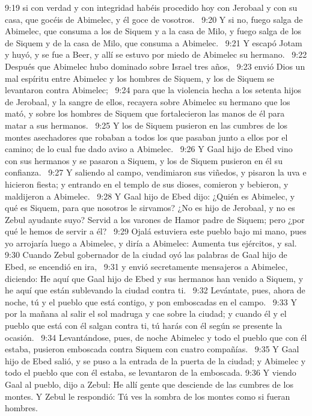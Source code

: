 9:19 si con verdad y con integridad habéis procedido hoy con Jerobaal y con su casa, que gocéis de Abimelec, y él goce de vosotros.  
9:20 Y si no, fuego salga de Abimelec, que consuma a los de Siquem y a la casa de Milo, y fuego salga de los de Siquem y de la casa de Milo, que consuma a Abimelec.  
9:21 Y escapó Jotam y huyó, y se fue a Beer, y allí se estuvo por miedo de Abimelec su hermano.  
9:22 Después que Abimelec hubo dominado sobre Israel tres años,  
9:23 envió Dios un mal espíritu entre Abimelec y los hombres de Siquem, y los de Siquem se levantaron contra Abimelec;  
9:24 para que la violencia hecha a los setenta hijos de Jerobaal, y la sangre de ellos, recayera sobre Abimelec su hermano que los mató, y sobre los hombres de Siquem que fortalecieron las manos de él para matar a sus hermanos.  
9:25 Y los de Siquem pusieron en las cumbres de los montes asechadores que robaban a todos los que pasaban junto a ellos por el camino; de lo cual fue dado aviso a Abimelec.  
9:26 Y Gaal hijo de Ebed vino con sus hermanos y se pasaron a Siquem, y los de Siquem pusieron en él su confianza.  
9:27 Y saliendo al campo, vendimiaron sus viñedos, y pisaron la uva e hicieron fiesta; y entrando en el templo de sus dioses, comieron y bebieron, y maldijeron a Abimelec.  
9:28 Y Gaal hijo de Ebed dijo: ¿Quién es Abimelec, y qué es Siquem, para que nosotros le sirvamos? ¿No es hijo de Jerobaal, y no es Zebul ayudante suyo? Servid a los varones de Hamor padre de Siquem; pero ¿por qué le hemos de servir a él?  
9:29 Ojalá estuviera este pueblo bajo mi mano, pues yo arrojaría luego a Abimelec, y diría a Abimelec: Aumenta tus ejércitos, y sal.  
9:30 Cuando Zebul gobernador de la ciudad oyó las palabras de Gaal hijo de Ebed, se encendió en ira,  
9:31 y envió secretamente mensajeros a Abimelec, diciendo: He aquí que Gaal hijo de Ebed y sus hermanos han venido a Siquem, y he aquí que están sublevando la ciudad contra ti.  
9:32 Levántate, pues, ahora de noche, tú y el pueblo que está contigo, y pon emboscadas en el campo.  
9:33 Y por la mañana al salir el sol madruga y cae sobre la ciudad; y cuando él y el pueblo que está con él salgan contra ti, tú harás con él según se presente la ocasión.  
9:34 Levantándose, pues, de noche Abimelec y todo el pueblo que con él estaba, pusieron emboscada contra Siquem con cuatro compañías.  
9:35 Y Gaal hijo de Ebed salió, y se puso a la entrada de la puerta de la ciudad; y Abimelec y todo el pueblo que con él estaba, se levantaron de la emboscada. 
9:36 Y viendo Gaal al pueblo, dijo a Zebul: He allí gente que desciende de las cumbres de los montes. Y Zebul le respondió: Tú ves la sombra de los montes como si fueran hombres.  
